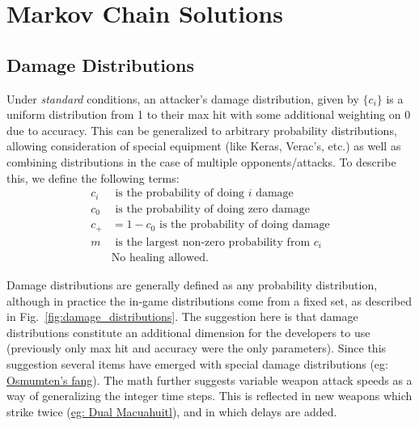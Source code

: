 \chapter{Markov Chain Solutions}
	\section{Damage Distributions}
		Under \textit{standard} conditions, an attacker's damage distribution, given by $\{c_i\}$ is a uniform distribution from 1 to their max hit with some additional weighting on 0 due to accuracy. This can be generalized to arbitrary probability distributions, allowing consideration of special equipment (like Keras, Verac's, etc.) as well as combining distributions in the case of multiple opponents/attacks. To describe this, we define the following terms:
		\begin{align}
		c_i & \text{ is the probability of doing $i$ damage} \\
		c_0 & \text{ is the probability of doing zero damage} \\
		c_+ &= 1 - c_0 \text{ is the probability of doing damage} \\
		m & \text{ is the largest non-zero probability from $c_i$} \\
		&\text{No healing allowed.}
		\end{align}

		Damage distributions are generally defined as any probability distribution, although in practice the in-game distributions come from a fixed set, as described in Fig.~\ref{fig:damage_distributions}. The suggestion here is that damage distributions constitute an additional dimension for the developers to use (previously only max hit and accuracy were the only parameters). Since this suggestion several items have emerged with special damage distributions (eg: \href{https://oldschool.runescape.wiki/w/Osmumten%27s_fang}{Osmumten's fang}). The math further suggests variable weapon attack speeds as a way of generalizing the integer time steps. This is reflected in new weapons which strike twice (\href{https://oldschool.runescape.wiki/w/Dual_macuahuitl}{eg: Dual Macuahuitl}), and in which delays are added. 


